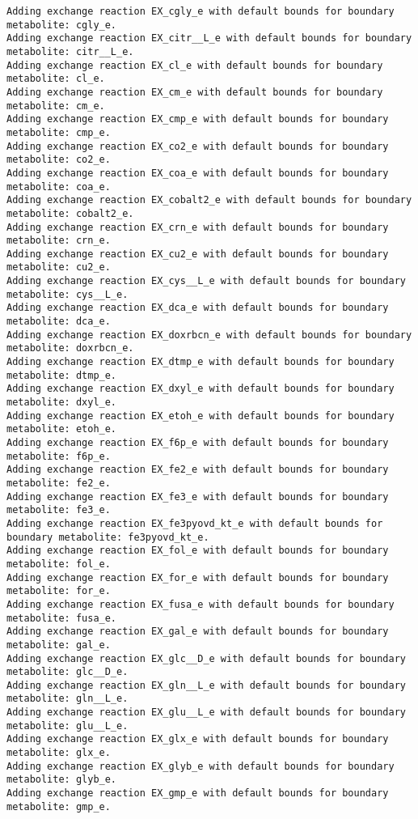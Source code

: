 \documentclass[
  letterpaper,
  DIV=11,
  numbers=noendperiod]{scrartcl}
\begin{document}
\begin{verbatim}
Adding exchange reaction EX_cgly_e with default bounds for boundary metabolite: cgly_e.
Adding exchange reaction EX_citr__L_e with default bounds for boundary metabolite: citr__L_e.
Adding exchange reaction EX_cl_e with default bounds for boundary metabolite: cl_e.
Adding exchange reaction EX_cm_e with default bounds for boundary metabolite: cm_e.
Adding exchange reaction EX_cmp_e with default bounds for boundary metabolite: cmp_e.
Adding exchange reaction EX_co2_e with default bounds for boundary metabolite: co2_e.
Adding exchange reaction EX_coa_e with default bounds for boundary metabolite: coa_e.
Adding exchange reaction EX_cobalt2_e with default bounds for boundary metabolite: cobalt2_e.
Adding exchange reaction EX_crn_e with default bounds for boundary metabolite: crn_e.
Adding exchange reaction EX_cu2_e with default bounds for boundary metabolite: cu2_e.
Adding exchange reaction EX_cys__L_e with default bounds for boundary metabolite: cys__L_e.
Adding exchange reaction EX_dca_e with default bounds for boundary metabolite: dca_e.
Adding exchange reaction EX_doxrbcn_e with default bounds for boundary metabolite: doxrbcn_e.
Adding exchange reaction EX_dtmp_e with default bounds for boundary metabolite: dtmp_e.
Adding exchange reaction EX_dxyl_e with default bounds for boundary metabolite: dxyl_e.
Adding exchange reaction EX_etoh_e with default bounds for boundary metabolite: etoh_e.
Adding exchange reaction EX_f6p_e with default bounds for boundary metabolite: f6p_e.
Adding exchange reaction EX_fe2_e with default bounds for boundary metabolite: fe2_e.
Adding exchange reaction EX_fe3_e with default bounds for boundary metabolite: fe3_e.
Adding exchange reaction EX_fe3pyovd_kt_e with default bounds for boundary metabolite: fe3pyovd_kt_e.
Adding exchange reaction EX_fol_e with default bounds for boundary metabolite: fol_e.
Adding exchange reaction EX_for_e with default bounds for boundary metabolite: for_e.
Adding exchange reaction EX_fusa_e with default bounds for boundary metabolite: fusa_e.
Adding exchange reaction EX_gal_e with default bounds for boundary metabolite: gal_e.
Adding exchange reaction EX_glc__D_e with default bounds for boundary metabolite: glc__D_e.
Adding exchange reaction EX_gln__L_e with default bounds for boundary metabolite: gln__L_e.
Adding exchange reaction EX_glu__L_e with default bounds for boundary metabolite: glu__L_e.
Adding exchange reaction EX_glx_e with default bounds for boundary metabolite: glx_e.
Adding exchange reaction EX_glyb_e with default bounds for boundary metabolite: glyb_e.
Adding exchange reaction EX_gmp_e with default bounds for boundary metabolite: gmp_e.

\end{verbatim}
\end{document}
